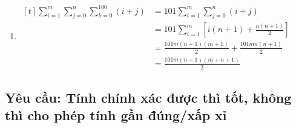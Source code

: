 \documentclass[12pt, letterpaper]{article}
\begin{document}
\begin{enumerate}
	\item $ \begin{aligned}[t]
			      \sum^{m}_{i = 1} \sum^{n}_{j = 0} \sum^{100}_{k = 0} (i + j)
			       & = 101 \sum^{m}_{i = 1} \sum^{n}_{j = 0} (i + j)         \\
			       & = 101 \sum^{m}_{i = 1} [i(n + 1) + \frac{n(n + 1)}{2}]  \\
			       & = \frac{101m(n + 1)(m + 1)}{2} + \frac{101mn(n + 1)}{2} \\
			       & = \frac{101m(n + 1)(m + n + 1)}{2}
		      \end{aligned} $
\end{enumerate}

\subsection{Yêu cầu: Tính chính xác được thì tốt, không thì cho phép tính gần đúng/xấp xỉ}
\end{document}
